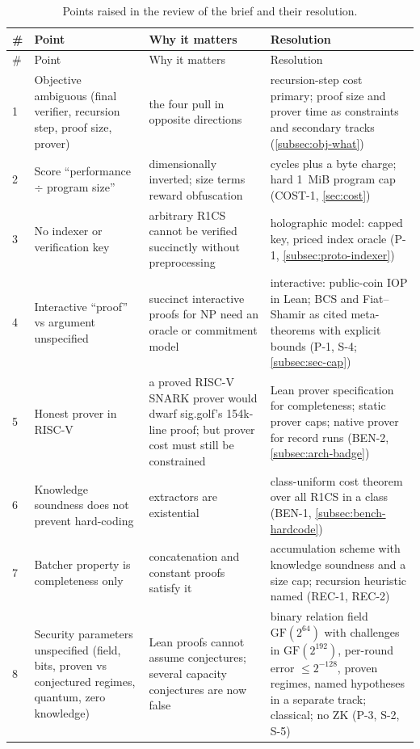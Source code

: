 \begingroup
\small
\renewcommand{\arraystretch}{1.15}
\begin{longtable}{@{}p{}p{}p{}p{}@{}}
\caption{Points raised in the review of the brief and their resolution.}\label{tab:brief-review}\\
\toprule
\# & Point & Why it matters & Resolution \\
\midrule
\endfirsthead
\toprule
\# & Point & Why it matters & Resolution \\
\midrule
\endhead
1 & Objective ambiguous (final verifier, recursion step, proof size, prover) & the four pull in opposite directions & recursion-step cost primary; proof size and prover time as constraints and secondary tracks (\cref{subsec:obj-what}) \\
2 & Score \enquote{performance $\div$ program size} & dimensionally inverted; size terms reward obfuscation & cycles plus a byte charge; hard 1~MiB program cap (COST-1, \cref{sec:cost}) \\
3 & No indexer or verification key & arbitrary R1CS cannot be verified succinctly without preprocessing & holographic model: capped key, priced index oracle (P-1, \cref{subsec:proto-indexer}) \\
4 & Interactive \enquote{proof} vs argument unspecified & succinct interactive proofs for NP need an oracle or commitment model & interactive: public-coin IOP in Lean; BCS and Fiat--Shamir as cited meta-theorems with explicit bounds (P-1, S-4; \cref{subsec:sec-cap}) \\
5 & Honest prover in RISC-V & a proved RISC-V SNARK prover would dwarf sig.golf's 154k-line proof; but prover cost must still be constrained & Lean prover specification for completeness; static prover caps; native prover for record runs (BEN-2, \cref{subsec:arch-badge}) \\
6 & Knowledge soundness does not prevent hard-coding & extractors are existential & class-uniform cost theorem over all R1CS in a class (BEN-1, \cref{subsec:bench-hardcode}) \\
7 & Batcher property is completeness only & concatenation and constant proofs satisfy it & accumulation scheme with knowledge soundness and a size cap; recursion heuristic named (REC-1, REC-2) \\
8 & Security parameters unspecified (field, bits, proven vs conjectured regimes, quantum, zero knowledge) & Lean proofs cannot assume conjectures; several capacity conjectures are now false & binary relation field $\mathrm{GF}(2^{64})$ with challenges in $\mathrm{GF}(2^{192})$, per-round error $\le 2^{-128}$, proven regimes, named hypotheses in a separate track; classical; no ZK (P-3, S-2, S-5) \\

\end{longtable}
